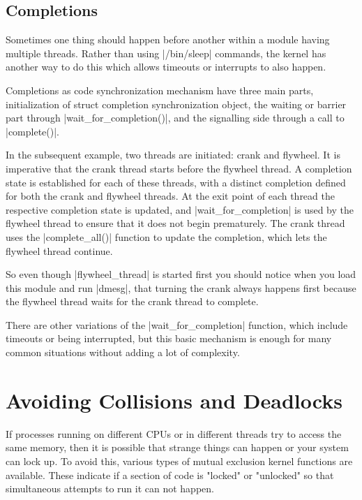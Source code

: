 \documentclass[10pt, oneside]{book}
\begin{document}


\subsection{Completions}
\label{sec:completion}
Sometimes one thing should happen before another within a module having multiple threads.
Rather than using \sh|/bin/sleep| commands, the kernel has another way to do this which allows timeouts or interrupts to also happen.

Completions as code synchronization mechanism have three main parts, initialization of struct completion synchronization object, the waiting or barrier part through \cpp|wait_for_completion()|, and the signalling side through a call to \cpp|complete()|.

In the subsequent example, two threads are initiated: crank and flywheel. 
It is imperative that the crank thread starts before the flywheel thread. 
A completion state is established for each of these threads, with a distinct completion defined for both the crank and flywheel threads.
At the exit point of each thread the respective completion state is updated, and \cpp|wait_for_completion| is used by the flywheel thread to ensure that it does not begin prematurely.
The crank thread uses the \cpp|complete_all()| function to update the completion, which lets the flywheel thread continue.

So even though \cpp|flywheel_thread| is started first you should notice when you load this module and run \sh|dmesg|, that turning the crank always happens first because the flywheel thread waits for the crank thread to complete.

There are other variations of the \cpp|wait_for_completion| function, which include timeouts or being interrupted, but this basic mechanism is enough for many common situations without adding a lot of complexity.


\section{Avoiding Collisions and Deadlocks}
\label{sec:synchronization}
If processes running on different CPUs or in different threads try to access the same memory, then it is possible that strange things can happen or your system can lock up.
To avoid this, various types of mutual exclusion kernel functions are available.
These indicate if a section of code is "locked" or "unlocked" so that simultaneous attempts to run it can not happen.
\end{document}
